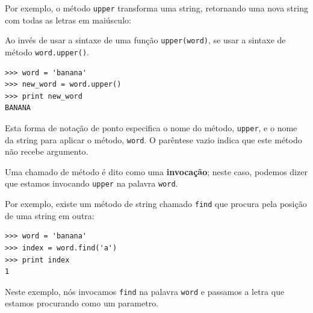 {Por exemplo, o método {\tt upper} transforma uma string, retornando uma nova
string com todas as letras em maiúsculo:


Ao invés de usar a sintaxe de uma função {\tt upper(word)}, se usar a sintaxe
de método {\tt word.upper()}.


\beforeverb
\begin{verbatim}
>>> word = 'banana'
>>> new_word = word.upper()
>>> print new_word
BANANA
\end{verbatim}
\afterverb
%
%
Esta forma de notação de ponto especifica o nome do método, {\tt upper}, e
o nome da string para aplicar o método, {\tt word}. O parêntese vazio indica
que este método não recebe argumento.



Uma chamado de método é dito como uma {\bf invocação}; neste caso, podemos
dizer que estamos invocando {\tt upper} na palavra {\tt word}.



Por exemplo, existe um método de string chamado {\tt find} que procura pela
posição de uma string em outra:

\beforeverb
\begin{verbatim}
>>> word = 'banana'
>>> index = word.find('a')
>>> print index
1
\end{verbatim}
\afterverb
%
%
Neste exemplo, nós invocamos {\tt find} na palavra {\tt word} e passamos a
letra que estamos procurando como um parametro.


}
